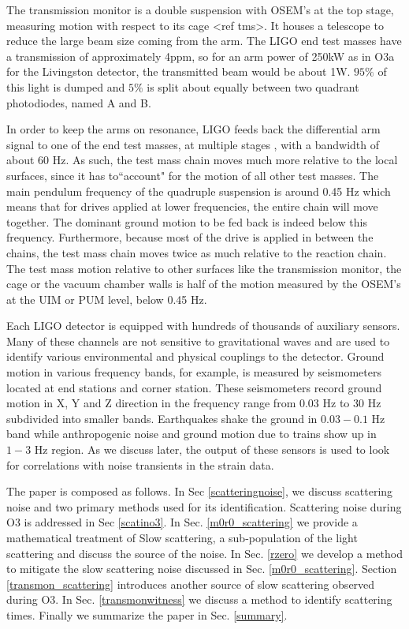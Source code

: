 \documentclass[12pt]{iopart}
\begin{document}
The transmission monitor is a double suspension with OSEM's at the top stage, measuring motion with respect to its cage <ref tms>. It houses a telescope to reduce the large beam size coming from the arm. The LIGO end test masses have a transmission of approximately 4ppm, so for an arm power of 250kW as in O3a for the Livingston detector, the transmitted beam would be about 1W. $95\%$ of this light is dumped and $5\%$ is split about equally between two quadrant photodiodes, named A and B. 

In order to keep the arms on resonance, LIGO feeds back the differential arm signal to one of the end test masses, at multiple stages \cite{Martynov_2016}, with a bandwidth of about 60 Hz. As such, the test mass chain moves much more relative to the local surfaces, since it has to``account" for the motion of all other test masses. The main pendulum frequency of the quadruple suspension is around 0.45 Hz which means that for drives applied at lower frequencies, the entire chain will move together. The dominant ground motion to be fed back is indeed below this frequency. Furthermore, because most of the drive is applied in between the chains, the test mass chain moves twice as much relative to the reaction chain. The test mass motion relative to other surfaces like the transmission monitor, the cage or the vacuum chamber walls is half of the motion measured by the OSEM's at the UIM or PUM level, below 0.45 Hz.

Each LIGO detector is equipped with hundreds of thousands of auxiliary sensors. Many of these channels are not sensitive to gravitational waves and are used to identify various environmental and physical couplings to the detector.
Ground motion in various frequency bands, for example, is measured by seismometers located at end stations and corner station. These seismometers record ground motion in X, Y and Z direction in the frequency range from 0.03 Hz to 30 Hz subdivided into smaller bands. Earthquakes shake the ground in $0.03-0.1$ Hz band while anthropogenic noise and ground motion due to trains show up in $1-3$ Hz region. As we discuss later, the output of these sensors is used to look for correlations with noise transients in the strain data.

The paper is composed as follows. In Sec \ref{scatteringnoise}, we discuss scattering noise and two primary methods used for its identification. Scattering noise during O3 is addressed in Sec   \ref{scatino3}. In Sec. \ref{m0r0_scattering} we provide a mathematical treatment of Slow scattering, a sub-population of the light scattering and discuss the source of the noise. In Sec. \ref{rzero} we develop a method to mitigate the slow scattering noise discussed in Sec. \ref{m0r0_scattering}. Section \ref{transmon_scattering} introduces another source of slow scattering observed during O3. In Sec. \ref{transmonwitness} we discuss a method to identify scattering times. Finally we summarize the paper in Sec. \ref{summary}. 
\end{document}
